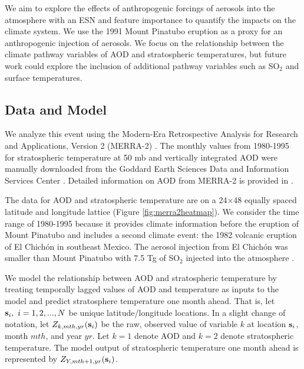 \documentclass[AMS,STIX2COL]{WileyNJD-v2}
\begin{document}
We aim to explore the effects of anthropogenic forcings of aerosols into the atmosphere with an ESN and feature importance to quantify the impacts on the climate system. We use the 1991 Mount Pinatubo eruption as a proxy for an anthropogenic injection of aerosols. We focus on the relationship between the climate pathway variables of AOD and stratospheric temperatures, but future work could explore the inclusion of additional pathway variables such as SO$_2$ and surface temperatures.

\subsection{Data and Model}

We analyze this event using the Modern-Era Retrospective Analysis for Research and Applications, Version 2 (MERRA-2) \citep{gelaro2017}. The monthly values from 1980-1995 for stratospheric temperature at 50 mb \citep{merra2temp} and vertically integrated AOD \citep{merra2aod} were manually downloaded from the Goddard Earth Sciences Data and Information Services Center \citep{merra2data}. Detailed information on AOD from MERRA-2 is provided in \citet{randles2017}. 

The data for AOD and stratospheric temperature are on a 24$\times$48 equally spaced latitude and longitude lattice (Figure \ref{fig:merra2heatmap}). We consider the time range of 1980-1995 because it provides climate information before the eruption of Mount Pinatubo and includes a second climate event: the 1982 volcanic eruption of El Chichón in southeast Mexico. The aerosol injection from El Chichón was smaller than Mount Pinatubo with 7.5 Tg of SO$_2$ injected into the atmosphere \citep{krueger2008}. 

We model the relationship between AOD and stratospheric temperature by treating temporally lagged values of AOD and temperature as inputs to the model and predict stratosphere temperature one month ahead. That is, let ${\bf s}_i,\ i=1,2,...,N$ be unique latitude/longitude locations. In a slight change of notation, let $Z_{k,mth,yr}({\bf s}_i)$ be the raw, observed value of variable $k$ at location ${\bf s}_i$, month $mth$, and year $yr$. Let $k=1$ denote AOD and $k=2$ denote stratospheric temperature. The model output of stratospheric temperature one month ahead is represented by $Z_{Y,mth+1,yr}({\bf s}_i)$.
\end{document}
